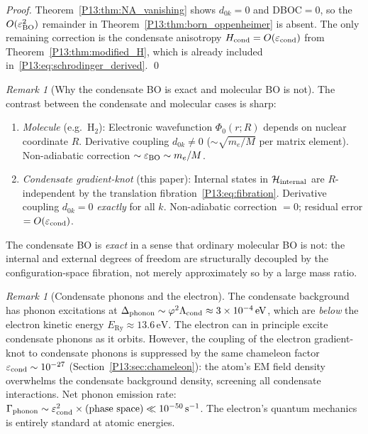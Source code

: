 \documentclass[11pt,a4paper]{article}
\theoremstyle{definition}
\theoremstyle{remark}
\newtheorem{remark}[theorem]{Remark}
\newcommand{\vp}{\varphi}
\newcommand{\Lcond}{\Lambda_{\mathrm{cond}}}
\newcommand{\ERy}{E_{\mathrm{Ry}}}
\newcommand{\eps}{\varepsilon}
\newcommand{\Hcond}{H_{\mathrm{cond}}}
\begin{document}
\begin{proof}
Theorem~\ref{P13:thm:NA_vanishing} shows $d_{0k}=0$ and DBOC$=0$,
so the $O(\eps_{\rm BO}^2)$ remainder in Theorem~\ref{P13:thm:born_oppenheimer}
is absent.
The only remaining correction is the condensate anisotropy
$\Hcond=O(\eps_{\rm cond})$ from Theorem~\ref{P13:thm:modified_H},
which is already included in~\eqref{P13:eq:schrodinger_derived}.
\qed
\end{proof}

\begin{remark}[Why the condensate BO is exact and molecular BO is not]
\label{P13:rem:BO_comparison}
The contrast between the condensate and molecular cases is sharp:
\begin{enumerate}[noitemsep]
\item \emph{Molecule} (e.g.\ H$_2$):
  Electronic wavefunction $\Phi_0(r;R)$ depends on nuclear coordinate $R$.
  Derivative coupling $d_{0k}\neq0$ ($\sim\sqrt{m_e/M}$ per matrix element).
  Non-adiabatic correction $\sim\eps_{\rm BO}\sim m_e/M$.
\item \emph{Condensate gradient-knot} (this paper):
  Internal states in $\mathcal{H}_{\rm internal}$ are $R$-independent by the
  translation fibration~\eqref{P13:eq:fibration}.
  Derivative coupling $d_{0k}=0$ \emph{exactly} for all $k$.
  Non-adiabatic correction $=0$; residual error $=O(\eps_{\rm cond})$.
\end{enumerate}
The condensate BO is \emph{exact} in a sense that ordinary molecular BO is not:
the internal and external degrees of freedom are structurally decoupled
by the configuration-space fibration, not merely approximately so by a large mass ratio.
\end{remark}

\begin{remark}[Condensate phonons and the electron]
\label{P13:rem:phonons}
The condensate background has phonon excitations at
$\Delta_{\rm phonon}\sim\vp^2\Lcond\approx3\times10^{-4}\,\mathrm{eV}$,
which are \emph{below} the electron kinetic energy $\ERy\approx13.6\,\mathrm{eV}$.
The electron can in principle excite condensate phonons as it orbits.
However, the coupling of the electron gradient-knot to condensate
phonons is suppressed by the same chameleon factor
$\eps_{\rm cond}\sim10^{-27}$ (Section~\ref{P13:sec:chameleon}):
the atom's EM field density overwhelms the condensate background density,
screening all condensate interactions.
Net phonon emission rate: $\Gamma_{\rm phonon}\sim\eps_{\rm cond}^2\times
\text{(phase space)}\ll10^{-50}\,\mathrm{s}^{-1}$.
The electron's quantum mechanics is entirely standard at atomic energies.
\end{remark}
\end{document}
